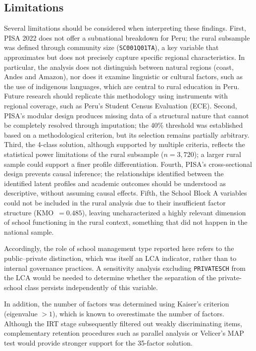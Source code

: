 \documentclass[runningheads]{llncs}
\begin{document}
\subsection{Limitations}
\label{sec:limitations}

Several limitations should be considered when interpreting these
findings. First, PISA 2022 does not offer a subnational breakdown
for Peru; the rural subsample was defined through community size
(\texttt{SC001Q01TA}), a key variable that approximates but does
not precisely capture specific regional characteristics. In
particular, the analysis does not distinguish between natural
regions (coast, Andes and Amazon), nor does it examine linguistic
or cultural factors, such as the use of indigenous languages,
which are central to rural education in Peru. Future research
should replicate this methodology using instruments with regional
coverage, such as Peru's Student Census Evaluation (ECE). Second,
PISA's modular design produces missing data of a structural
nature that cannot be completely resolved through imputation; the
40\% threshold was established based on a methodological
criterion, but its selection remains partially arbitrary. Third,
the 4-class solution, although supported by multiple criteria,
reflects the statistical power limitations of the rural subsample
(\(n = 3{,}720\)); a larger rural sample could support a finer
profile differentiation. Fourth, PISA's cross-sectional design
prevents causal inference; the relationships identified between
the identified latent profiles and academic outcomes should be
understood as descriptive, without assuming causal effects.
Fifth, the School Block A variables could not be included in the
rural analysis due to their insufficient factor structure
(KMO~$= 0.485$), leaving uncharacterized a highly relevant
dimension of school functioning in the rural context, something
that did not happen in the national sample.

Accordingly, the role of school management type reported here
refers to the public--private distinction, which was itself an
LCA indicator, rather than to internal governance practices. A
sensitivity analysis excluding \texttt{PRIVATESCH} from the LCA
would be needed to determine whether the separation of the
private-school class persists independently of this variable.

In addition, the number of factors was determined using Kaiser's
criterion (eigenvalue $> 1$), which is known to overestimate the
number of factors. Although the IRT stage subsequently filtered
out weakly discriminating items, complementary retention
procedures such as parallel analysis or Velicer's MAP test would
provide stronger support for the 35-factor solution.
\end{document}
